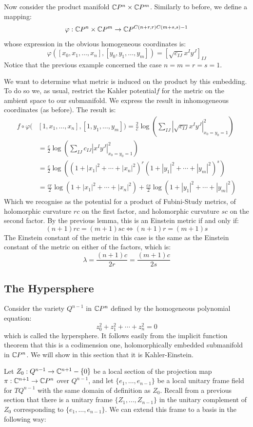 Now consider the product manifold $\mathbb{C}P^{n} \times \mathbb{C}P^{m}$.  Similarly to before, we define a mapping:
%
$$ \varphi : \mathbb{C}P^{n} \times \mathbb{C}P^{m} \rightarrow \mathbb{C}P^{ C(n + r, r) C( m + s, s) - 1} $$
%
whose expression in the obvious homogeneous coordinates is:
%
$$ \varphi( [x_0, x_1, \ldots, x_n], [y_0, y_1, \ldots, y_m] ) = [ \sqrt{c_{IJ}} x^I y^J ]_{IJ} $$
%
Notice that the previous example concerned the case $n=m=r=s=1$.  

We want to determine what metric is induced on the product by this embedding.  To do so we, as usual, restrict the Kahler potential$f$ for the metric on the ambient space to our submanifold.  We express the result in inhomogeneous coordinates (as before). The result is:
%
\begin{align*}
f \circ \varphi( & [1, x_1, \ldots, x_n], [1, y_1, \ldots, y_m] ) = \frac{2}{c} \log \left( \sum_{IJ} | \sqrt{c_{IJ}} x^I y^J |^2_{x_0 = y_0 = 1} \right) \\
&= \frac{c}{2} \log \left( \sum_{IJ} c_{IJ} |x^I y^J|^2_{x_0 = y_0 = 1} \right) \\
&= \frac{c}{2} \log \left( (1 + |x_1|^2 + \cdots + |x_n|^2 )^r (1 + |y_1|^2 + \cdots + |y_m|^2 )^s \right) \\
&= \frac{cr}{2} \log ( 1 + |x_1|^2 + \cdots + |x_n|^2 ) + \frac{cs}{2} \log (1 + |y_1|^2 + \cdots + |y_m|^2 )
\end{align*}
%
Which we recognise as the potential for a product of Fubini-Study metrics, of holomorphic curvature $rc$ on the first factor, and holomorphic curvature $sc$ on the second factor.  By the previous lemma, this is an Einstein metric if and only if:
%
$$ (n+1)rc = (m+1)sc \Leftrightarrow (n+1)r = (m+1)s $$
%
The Einstein constant of the metric in this case is the same as the Einstein constant of the metric on either of the factors, which is:
%
$$ \lambda = \frac{(n+1)c}{2r} = \frac{(m+1)c}{2s} $$

\subsection{The Hypersphere}

Consider the variety $Q^{n-1}$ in $\mathbb{C}P^n$ defined by the homogeneous polynomial equation:
%
$$ z_0^2 + z_1^2 + \cdots + z_n^2 = 0 $$
%
which is called the hypersphere.  It follows easily from the implicit function theorem that this is a codimension one, holomorphically embedded submanifold in $\mathbb{C}P^n$.  We will show in this section that it is Kahler-Einstein.

Let $Z_0 : Q^{n-1} \rightarrow \mathbb{C}^{n+1} - \{0\}$ be a local section of the projection map $\pi: \mathbb{C}^{n+1} \rightarrow \mathbb{C}P^n$ over $Q^{n-1}$, and let $\{ e_1, \ldots, e_{n-1} \}$ be a local unitary frame field for $TQ^{n-1}$ with the same domain of definition as $Z_0$.  Recall from a previous section that there is a unitary frame $\{ Z_1, \ldots, Z_{n-1} \}$ in the unitary complement of $Z_0$ corresponding to $\{ e_1, \ldots, e_{n-1} \}$.  We can extend this frame to a basis in the following way:

